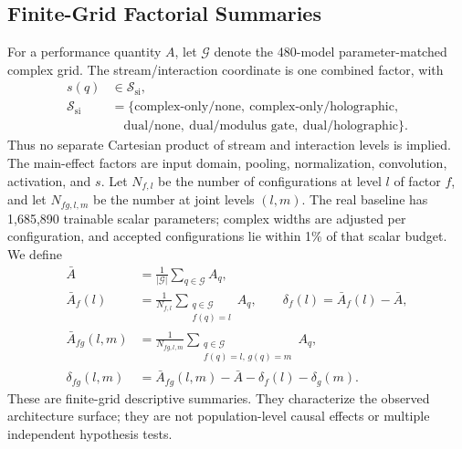 \subsection{Finite-Grid Factorial Summaries}
For a performance quantity $A$, let $\mathcal{G}$ denote the 480-model parameter-matched complex grid. The stream/interaction coordinate is one combined factor, with
\begin{equation}
\begin{aligned}
s(q)&\in\mathcal{S}_{\mathrm{si}},\\
\mathcal{S}_{\mathrm{si}}&=\{\text{complex-only/none},\ \text{complex-only/holographic},\\
&\quad\text{dual/none},\ \text{dual/modulus gate},\ \text{dual/holographic}\}.
\end{aligned}
\end{equation}
Thus no separate Cartesian product of stream and interaction levels is implied. The main-effect factors are input domain, pooling, normalization, convolution, activation, and $s$. Let $N_{f,l}$ be the number of configurations at level $l$ of factor $f$, and let $N_{fg,l,m}$ be the number at joint levels $(l,m)$. The real baseline has 1,685,890 trainable scalar parameters; complex widths are adjusted per configuration, and accepted configurations lie within 1\% of that scalar budget. We define
\begin{align}
\bar A&=\frac{1}{|\mathcal{G}|}\sum_{q\in\mathcal{G}}A_q,\\
\bar A_f(l)&=\frac{1}{N_{f,l}}\sum_{\substack{q\in\mathcal{G}\\f(q)=l}}A_q,\qquad
\delta_f(l)=\bar A_f(l)-\bar A,\\
\bar A_{fg}(l,m)&=\frac{1}{N_{fg,l,m}}\sum_{\substack{q\in\mathcal{G}\\f(q)=l,\,g(q)=m}}A_q,\\
\delta_{fg}(l,m)&=\bar A_{fg}(l,m)-\bar A-\delta_f(l)-\delta_g(m).
\label{eq:factor-effects}
\end{align}
These are finite-grid descriptive summaries. They characterize the observed architecture surface; they are not population-level causal effects or multiple independent hypothesis tests.

